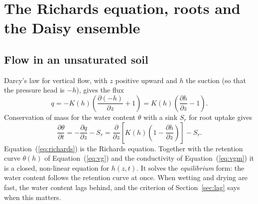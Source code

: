 \chapter{The Richards equation, roots and the Daisy ensemble}

\section{Flow in an unsaturated soil}
Darcy's law for vertical flow, with $z$ positive upward and $h$ the suction (so that the pressure head is $-h$), gives the flux
\begin{equation}\label{eq:darcy}\boxed{q = -K(h)\left(\frac{\partial(-h)}{\partial z}+1\right)=K(h)\left(\frac{\partial h}{\partial z}-1\right).}\end{equation}
Conservation of mass for the water content $\theta$ with a sink $S_r$ for root uptake gives
\begin{equation}\label{eq:richards}\boxed{\frac{\partial\theta}{\partial t}=-\frac{\partial q}{\partial z}-S_r=\frac{\partial}{\partial z}\left[K(h)\left(1-\frac{\partial h}{\partial z}\right)\right]-S_r .}\end{equation}
Equation~(\ref{eq:richards}) is the Richards equation. Together with the retention curve $\theta(h)$ of Equation~(\ref{eq:vg}) and the conductivity of Equation~(\ref{eq:vgm}) it is a closed, non-linear equation for $h(z,t)$. It solves the \emph{equilibrium} form: the water content follows the retention curve at once. When wetting and drying are fast, the water content lags behind, and the criterion of Section~\ref{sec:lag} says when this matters.

